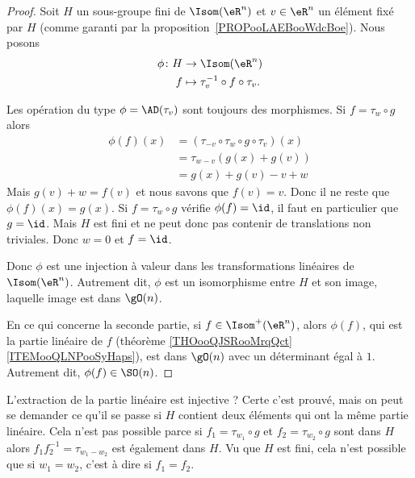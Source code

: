 \begin{proof}
	Soit \( H\) un sous-groupe fini de \( \Isom(\eR^n)\) et \( v\in \eR^n\) un élément fixé par \( H\) (comme garanti par la proposition~\ref{PROPooLAEBooWdcBoe}). Nous posons
	\begin{equation}
		\begin{aligned}
			\phi\colon H & \to \Isom(\eR^n)                        \\
			f            & \mapsto \tau_v^{-1}\circ f\circ \tau_v.
		\end{aligned}
	\end{equation}

	\begin{subproof}
		Les opération du type \( \phi=\AD(\tau_v)\) sont toujours des morphismes.
		Si \( f=\tau_w\circ g\) alors
		\begin{subequations}
			\begin{align}
				\phi(f)(x) & =(\tau_{-v}\circ\tau_w\circ g\circ\tau_v)(x) \\
				           & =\tau_{w-v}(   g(x)+g(v)  )                  \\
				           & =g(x)+g(v)-v+w
			\end{align}
		\end{subequations}
		Mais \( g(v)+w=f(v)\) et nous savons que \( f(v)=v\). Donc il ne reste que \( \phi(f)(x)=g(x)\).
		Si \( f=\tau_w\circ g\) vérifie \( \phi(f)=\id\), il faut en particulier que \( g=\id\). Mais \( H\) est fini et ne peut donc pas contenir de translations non triviales. Donc \( w=0\) et \( f=\id\).
	\end{subproof}
	Donc \( \phi\) est une injection à valeur dans les transformations linéaires de \( \Isom(\eR^n)\). Autrement dit, \( \phi\) est un isomorphisme entre \( H\) et son image, laquelle image est dans \( \gO(n)\).

	En ce qui concerne la seconde partie, si \( f\in\Isom^+(\eR^n)\), alors \( \phi(f)\), qui est la partie linéaire de \( f\) (théorème \ref{THOooQJSRooMrqQct}\ref{ITEMooQLNPooSyHaps}), est dans \( \gO(n)\) avec un déterminant égal à \( 1\). Autrement dit, \( \phi(f)\in\SO(n)\).
\end{proof}

L'extraction de la partie linéaire est injective ? Certe c'est prouvé, mais on peut se demander ce qu'il se passe si \( H\) contient deux éléments qui ont la même partie linéaire. Cela n'est pas possible parce si \( f_1=\tau_{w_1}\circ g\) et \( f_2=\tau_{w_2}\circ g\) sont dans \( H\) alors \( f_1f_2^{-1}=\tau_{w_1-w_2}\) est également dans \( H\). Vu que \( H\) est fini, cela n'est possible que si \( w_1=w_2\), c'est à dire si \( f_1=f_2\).


